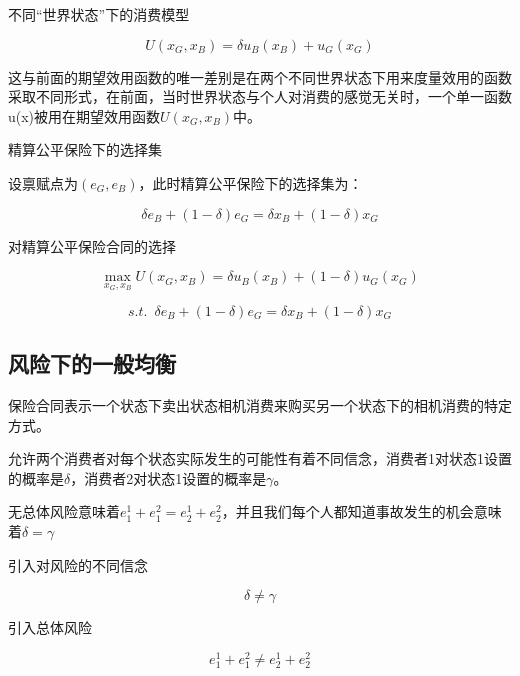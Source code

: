\documentclass{article}
\begin{document}
不同“世界状态”下的消费模型

\[
U(x_G,x_B)=\delta u_B(x_B)+u_G(x_G)
\]

这与前面的期望效用函数的唯一差别是在两个不同世界状态下用来度量效用的函数采取不同形式，在前面，当时世界状态与个人对消费的感觉无关时，一个单一函数u(x)被用在期望效用函数$ U(x_G,x_B) $中。

精算公平保险下的选择集

设禀赋点为$ (e_G,e_B) $，此时精算公平保险下的选择集为：

\[
\delta e_B+(1-\delta)e_G=\delta x_B+(1-\delta)x_G
\]

\hspace*{\fill}

对精算公平保险合同的选择

\[
\max\limits_{x_G,x_B} U(x_G,x_B)=\delta u_B(x_B)+(1-\delta)u_G(x_G)
\]

\[
s.t.\enspace \delta e_B+(1-\delta)e_G=\delta x_B+(1-\delta)x_G
\]

\subsection{风险下的一般均衡}

保险合同表示一个状态下卖出状态相机消费来购买另一个状态下的相机消费的特定方式。

允许两个消费者对每个状态实际发生的可能性有着不同信念，消费者1对状态1设置的概率是$\delta$，消费者2对状态1设置的概率是$\gamma$。

无总体风险意味着$ e^1_1+e^2_1=e^1_2+e^2_2 $，并且我们每个人都知道事故发生的机会意味着$ \delta=\gamma $

\hspace*{\fill}

引入对风险的不同信念

\[
\delta\ne\gamma
\]

引入总体风险

\[
e^1_1+e^2_1\ne e^1_2+e^2_2
\]
\end{document}
